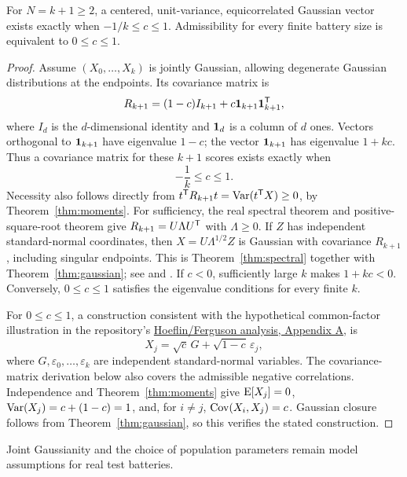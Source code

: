 \begin{proposition}
\label{prop:domain}
For \(N=k+1\geq2\), a centered, unit-variance, equicorrelated Gaussian
vector exists exactly when \(-1/k\leq c\leq1\). Admissibility for every
finite battery size is equivalent to \(0\leq c\leq1\).
\end{proposition}
\begin{proof}

Assume \((X_0,\ldots,X_k)\) is jointly Gaussian, allowing degenerate Gaussian
distributions at the endpoints. Its covariance matrix is
\begin{equation}
  R_{k+1}=(1-c)I_{k+1}+c\mathbf{1}_{k+1}\mathbf{1}_{k+1}^{\mathsf{T}},
  \label{eq:covariance}
\end{equation}
where \(I_d\) is the \(d\)-dimensional identity and \(\mathbf{1}_d\) is a column
of \(d\) ones. Vectors orthogonal to \(\mathbf{1}_{k+1}\) have eigenvalue
\(1-c\); the vector \(\mathbf{1}_{k+1}\) has eigenvalue \(1+kc\). Thus a
covariance matrix for these \(k+1\) scores exists exactly when
\begin{equation}
  \boxed{-\frac1k\leq c\leq1.}\label{eq:domain}
\end{equation}
Necessity also follows directly from
\(t^{\mathsf{T}}R_{k+1}t=\operatorname{Var}(t^{\mathsf{T}}X)\geq0\), by
Theorem~\ref{thm:moments}. For sufficiency, the real spectral theorem and
positive-square-root theorem give
\(R_{k+1}=U\Lambda U^{\mathsf{T}}\) with \(\Lambda\geq0\). If \(Z\) has independent
standard-normal coordinates, then \(X=U\Lambda^{1/2}Z\) is Gaussian with
covariance \(R_{k+1}\), including singular endpoints. This is
Theorem~\ref{thm:spectral} together with Theorem~\ref{thm:gaussian}; see
\citet[Theorems 7.29 and 7.38]{axler2024} and
\citet[author-hosted draft, Theorems 3.4.4--3.4.5]{gallager2013}.
If \(c<0\), sufficiently large \(k\) makes \(1+kc<0\). Conversely,
\(0\leq c\leq1\) satisfies the eigenvalue conditions for every finite \(k\).

For \(0\leq c\leq1\), a construction consistent with the hypothetical
common-factor illustration in the repository's
\href{https://github.com/AndersH3/composite_iq_checked_claims/blob/main/analyses/hoeflin-ferguson/composite_iq_analysis.tex}{Hoeflin/Ferguson analysis, Appendix A}, is
\begin{equation}
  X_j=\sqrt c\,G+\sqrt{1-c}\,\varepsilon_j,
  \label{eq:factor}
\end{equation}
where \(G,\varepsilon_0,\ldots,\varepsilon_k\) are independent standard-normal
variables. The covariance-matrix derivation below also covers the admissible
negative correlations. Independence and Theorem~\ref{thm:moments} give
\(\operatorname{E}[X_j]=0\), \(\operatorname{Var}(X_j)=c+(1-c)=1\), and, for \(i\ne j\),
\(\operatorname{Cov}(X_i,X_j)=c\). Gaussian closure follows from
Theorem~\ref{thm:gaussian}, so this verifies the stated construction.
\end{proof}
Joint Gaussianity and the choice of population parameters remain model
assumptions for real test batteries.

